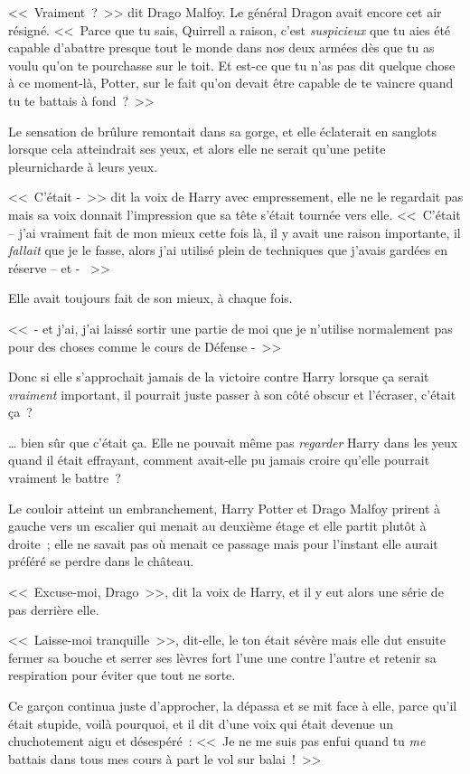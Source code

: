 <<~Vraiment~?~>> dit Drago Malfoy. Le général Dragon avait encore cet air résigné. <<~Parce que tu sais, Quirrell a raison, c'est \emph{suspicieux} que tu aies été capable d'abattre presque tout le monde dans nos deux armées dès que tu as voulu qu'on te pourchasse sur le toit. Et est-ce que tu n'as pas dit quelque chose à ce moment-là, Potter, sur le fait qu'on devait être capable de te vaincre quand tu te battais à fond~?~>>

Le sensation de brûlure remontait dans sa gorge, et elle éclaterait en sanglots lorsque cela atteindrait ses yeux, et alors elle ne serait qu'une petite pleurnicharde à leurs yeux.

<<~C'était -~>> dit la voix de Harry avec empressement, elle ne le regardait pas mais sa voix donnait l'impression que sa tête s'était tournée vers elle. <<~C'était -- j'ai vraiment fait de mon mieux cette fois là, il y avait une raison importante, il \emph{fallait} que je le fasse, alors j'ai utilisé plein de techniques que j'avais gardées en réserve -- et - ~>>

Elle avait toujours fait de son mieux, à chaque fois.

<<~- et j'ai, j'ai laissé sortir une partie de moi que je n'utilise normalement pas pour des choses comme le cours de Défense -~>>

Donc si elle s'approchait jamais de la victoire contre Harry lorsque ça serait \emph{vraiment} important, il pourrait juste passer à son côté obscur et l'écraser, c'était ça~?

… bien sûr que c'était ça. Elle ne pouvait même pas \emph{regarder} Harry dans les yeux quand il était effrayant, comment avait-elle pu jamais croire qu'elle pourrait vraiment le battre~?

Le couloir atteint un embranchement, Harry Potter et Drago Malfoy prirent à gauche vers un escalier qui menait au deuxième étage et elle partit plutôt à droite~; elle ne savait pas où menait ce passage mais pour l'instant elle aurait préféré se perdre dans le château.

<<~Excuse-moi, Drago~>>, dit la voix de Harry, et il y eut alors une série de pas derrière elle.

<<~Laisse-moi tranquille~>>, dit-elle, le ton était sévère mais elle dut ensuite fermer sa bouche et serrer ses lèvres fort l'une une contre l'autre et retenir sa respiration pour éviter que tout ne sorte.

Ce garçon continua juste d'approcher, la dépassa et se mit face à elle, parce qu'il était stupide, voilà pourquoi, et il dit d'une voix qui était devenue un chuchotement aigu et désespéré~: <<~Je ne me suis pas enfui quand tu \emph{me} battais dans tous mes cours à part le vol sur balai~!~>>

